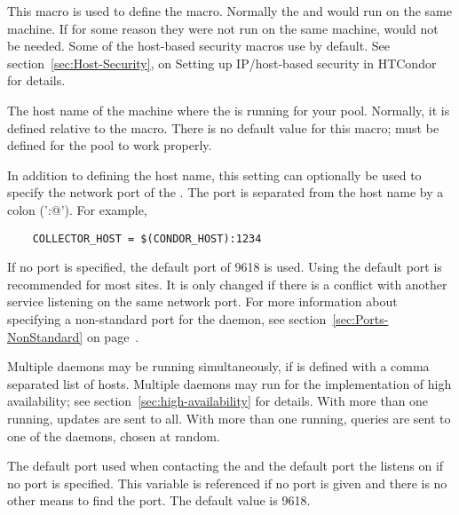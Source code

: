 \begin{description}
  
\label{param:CondorHost}
\item[\Macro{CONDOR\_HOST}]
  This macro is used to define the
   macro.  Normally the 
  and  would run on the same machine.  If for some
  reason they were not run on the same machine,
   would not be needed.  Some
  of the host-based security macros use  by
  default.  See section~\ref{sec:Host-Security}, on Setting up
  IP/host-based security in HTCondor for details.
  
\label{param:CollectorHost}
\item[\Macro{COLLECTOR\_HOST}]
  The host name of the machine where the  is running for
  your pool.  Normally, it is defined relative to
  the 
  macro.  There is no default value for this macro;
   must be defined for the pool to work
  properly.

  In addition to defining the host name, this setting can optionally be
  used to specify the network port of the .
  The port is separated from the host name by a colon ('\verb@:@').
  For example,
  \begin{verbatim}
    COLLECTOR_HOST = $(CONDOR_HOST):1234
  \end{verbatim}
  If no port is specified, the default port of 9618 is used.
  Using the default port is recommended for most sites.
  It is only changed if there is a conflict with another
  service listening on the same network port.
  For more information about specifying a non-standard port for the
   daemon,
  see section~\ref{sec:Ports-NonStandard} on
  page~\pageref{sec:Ports-NonStandard}.

  Multiple  daemons may be running simultaneously,
  if  is defined with a comma separated list of hosts.
  Multiple  daemons may run for the implementation of
  high availability; see section~\ref{sec:high-availability} for details.
  With more than one running, updates are sent to all.
  With more than one running, queries are sent to one of 
  the  daemons, chosen at random.

\label{param:CollectorPort}
\item[\Macro{COLLECTOR\_PORT}]
  The default port used when contacting the 
  and the default port the  listens on if
  no port is specified.
  This variable is referenced if no port is given
  and there is no other means to find the  port.
  The default value is 9618.



\end{description}
